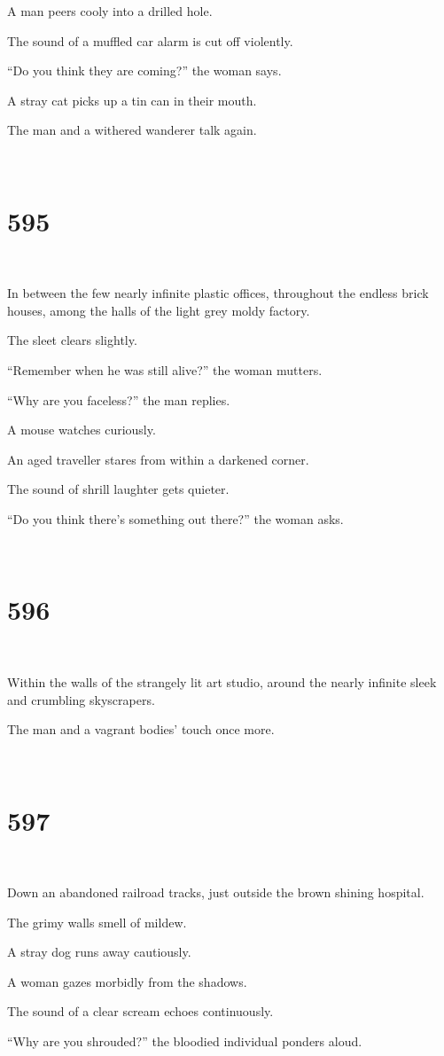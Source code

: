 \documentclass{report}
\begin{document}
A man peers cooly into a drilled hole.

The sound of a muffled car alarm is cut off violently.

``Do you think they are coming?'' the woman says.

A stray cat picks up a tin can in their mouth.

The man and a withered wanderer talk again.

~
\chapter*{595}
~

In between the few nearly infinite plastic offices, throughout the endless brick houses, among the halls of the light grey moldy factory.

The sleet clears slightly.

``Remember when he was still alive?'' the woman mutters.

``Why are you faceless?'' the man replies.

A mouse watches curiously.

An aged traveller stares from within a darkened corner.

The sound of shrill laughter gets quieter.

``Do you think there's something out there?'' the woman asks.

~
\chapter*{596}
~

Within the walls of the strangely lit art studio, around the nearly infinite sleek and crumbling skyscrapers.

The man and a vagrant bodies' touch once more.

~
\chapter*{597}
~

Down an abandoned railroad tracks, just outside the brown shining hospital.

The grimy walls smell of mildew.

A stray dog runs away cautiously.

A woman gazes morbidly from the shadows.

The sound of a clear scream echoes continuously.

``Why are you shrouded?'' the bloodied individual ponders aloud.
\end{document}
